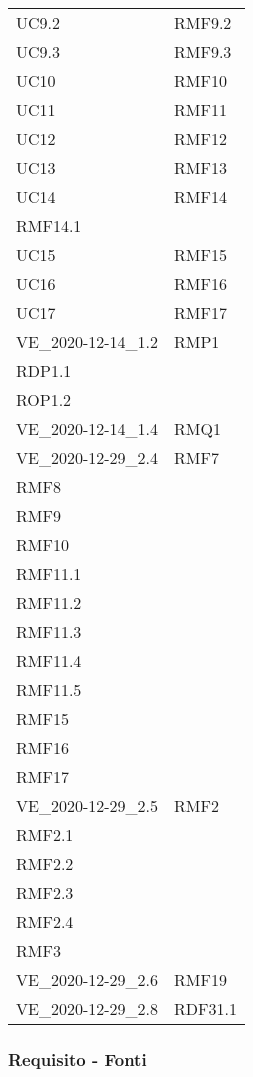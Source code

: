 \begin{longtable}[h!] { >{\centering}m{5cm} >{\centering}m{5cm} }
	 \tabularnewline
	 UC9.2 & RMF9.2
	 \tabularnewline
	 UC9.3 & RMF9.3
	 \tabularnewline
	 UC10 & RMF10
	 \tabularnewline
	 UC11 & RMF11
	 \tabularnewline
	 UC12 & RMF12
	 \tabularnewline
	 UC13 & RMF13
	 \tabularnewline
	 UC14 & RMF14 \\
	 RMF14.1
	 \tabularnewline
	 UC15 & RMF15
	 \tabularnewline
	 UC16 & RMF16
	 \tabularnewline
	 UC17 & RMF17
	 \tabularnewline
	 VE\_2020-12-14\_1.2 & RMP1 \\
	 RDP1.1 \\
	 ROP1.2
	 \tabularnewline
	 VE\_2020-12-14\_1.4 & RMQ1
	 \tabularnewline
	 VE\_2020-12-29\_2.4 & RMF7\\
	 RMF8 \\
	 RMF9 \\
	 RMF10 \\
	 RMF11.1 \\
	 RMF11.2 \\
	 RMF11.3 \\
	 RMF11.4 \\
	 RMF11.5 \\
	 RMF15 \\
	 RMF16 \\
	 RMF17 
	 \tabularnewline
	 VE\_2020-12-29\_2.5 & RMF2 \\
	 RMF2.1 \\
	 RMF2.2 \\
	 RMF2.3 \\
	 RMF2.4 \\
	 RMF3
	 \tabularnewline
	 VE\_2020-12-29\_2.6 & RMF19
	 \tabularnewline
	 VE\_2020-12-29\_2.8 & RDF31.1
	 \tabularnewline

\end{longtable}

\newpage

\subsubsection{Requisito - Fonti}

